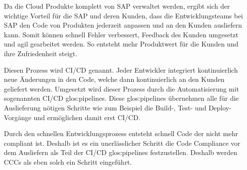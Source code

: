 \documentclass[../main.tex]{subfiles}
\begin{document}
Da die Cloud Produkte komplett von SAP verwaltet werden, ergibt sich der wichtige Vorteil für die SAP und deren Kunden, dass die Entwicklungsteams bei SAP den Code von Produkten jederzeit anpassen und an den Kunden ausliefern kann.
Somit können schnell Fehler verbessert, Feedback des Kunden umgesetzt und agil gearbeitet werden.
So entsteht mehr Produktwert für die Kunden und ihre Zufriedenheit steigt.


Diesen Prozess wird \gls{CI/CD} genannt.
Jeder Entwickler integriert kontinuierlich neue Änderungen in den Code, welche dann kontinuierlich an den Kunden geliefert werden.
Umgesetzt wird dieser Prozess durch die Automatisierung mit sogenannten \gls{CI/CD} \glspl{glos:pipeline}.
Diese \glspl{glos:pipeline} übernehmen alle für die Auslieferung nötigen Schritte wie zum Beispiel die Build-, Test- und Deploy-Vorgänge und ermöglichen damit erst \gls{CI/CD}.
\cite{CI/CD}

Durch den schnellen Entwicklungsprozess entsteht schnell Code der nicht mehr compliant ist.
Deshalb ist es ein unerlässlicher Schritt die Code Compliance vor dem Ausliefern als Teil der \gls{CI/CD} \glspl{glos:pipeline} festzustellen.
Deshalb werden \glspl{CCC} als eben solch ein Schritt eingeführt.
\end{document}

